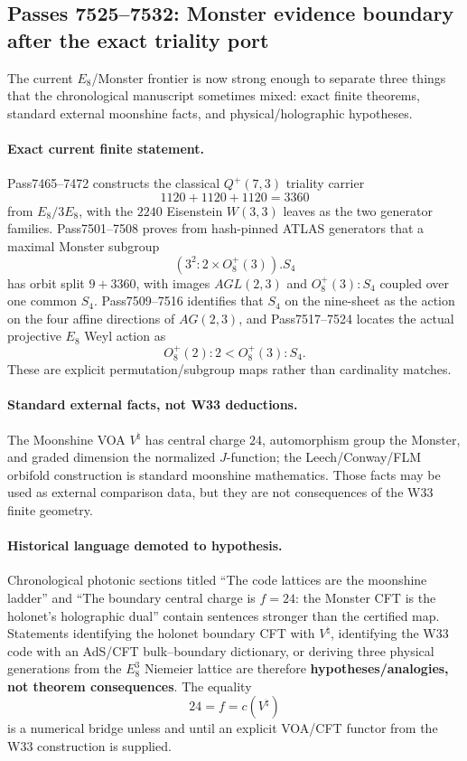 \subsection*{Passes 7525--7532: Monster evidence boundary after the exact triality port}

The current $E_8$/Monster frontier is now strong enough to separate three things
that the chronological manuscript sometimes mixed: exact finite theorems,
standard external moonshine facts, and physical/holographic hypotheses.

\paragraph{Exact current finite statement.}
Pass7465--7472 constructs the classical $Q^+(7,3)$ triality carrier
\[
1120+1120+1120=3360
\]
from $E_8/3E_8$, with the $2240$ Eisenstein $W(3,3)$ leaves as the two generator
families.  Pass7501--7508 proves from hash-pinned ATLAS generators that a maximal
Monster subgroup
\[
(3^2{:}2\times O_8^+(3)).S_4
\]
has orbit split $9+3360$, with images $AGL(2,3)$ and $O_8^+(3):S_4$ coupled over
one common $S_4$.  Pass7509--7516 identifies that $S_4$ on the nine-sheet as the
action on the four affine directions of $AG(2,3)$, and Pass7517--7524 locates the
actual projective $E_8$ Weyl action as
\[
\boxed{O_8^+(2):2<O_8^+(3):S_4}.
\]
These are explicit permutation/subgroup maps rather than cardinality matches.

\paragraph{Standard external facts, not W33 deductions.}
The Moonshine VOA $V^{\natural}$ has central charge $24$, automorphism group the
Monster, and graded dimension the normalized $J$-function; the Leech/Conway/FLM
orbifold construction is standard moonshine mathematics.  Those facts may be
used as external comparison data, but they are not consequences of the W33
finite geometry.

\paragraph{Historical language demoted to hypothesis.}
Chronological photonic sections titled ``The code lattices are the moonshine
ladder'' and ``The boundary central charge is $f=24$: the Monster CFT is the
holonet's holographic dual'' contain sentences stronger than the certified map.
Statements identifying the holonet boundary CFT with $V^{\natural}$, identifying
the W33 code with an AdS/CFT bulk--boundary dictionary, or deriving three
physical generations from the $E_8^3$ Niemeier lattice are therefore
\textbf{hypotheses/analogies, not theorem consequences}.  The equality
\[
24=f=c(V^{\natural})
\]
is a numerical bridge unless and until an explicit VOA/CFT functor from the W33
construction is supplied.

